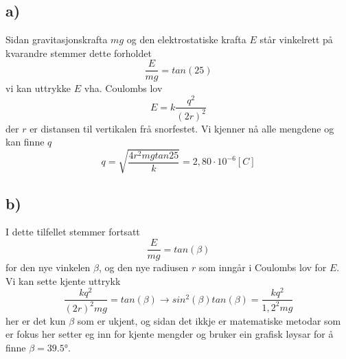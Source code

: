 \documentclass[12pt,a4paper]{article}
\begin{document}
    \subsection*{a)}
    Sidan gravitasjonskrafta $mg$ og den elektrostatiske krafta $E$ står vinkelrett
    på kvarandre stemmer dette forholdet
    \begin{equation}
      \frac{E}{mg} = tan(25)
    \end{equation}
    vi kan uttrykke $E$ vha. Coulombs lov
    \begin{equation}
      E = k\frac{q^2}{(2r)^2}
    \end{equation}
    der $r$ er distansen til vertikalen frå snorfestet. Vi kjenner nå alle mengdene og kan
    finne $q$
    \begin{equation}
      q = \sqrt{\frac{4r^2mgtan25}{k}} = 2,80\cdot10^{-6} [C]
    \end{equation}

    \subsection*{b)}
    I dette tilfellet stemmer fortsatt
    \begin{equation}
      \frac{E}{mg} = tan(\beta)
    \end{equation}
    for den nye vinkelen $\beta$, og den nye radiusen $r$ som inngår i Coulombs lov for $E$.
    Vi kan sette kjente uttrykk 
    \begin{equation}
      \frac{kq^2}{(2r)^2 mg} = tan(\beta) \longrightarrow 
      sin^2(\beta)tan(\beta) = \frac{kq^2}{1,2^2mg}
    \end{equation}
    her er det kun $\beta$ som er ukjent, og sidan det ikkje er matematiske
    metodar som er fokus her setter eg inn for kjente mengder og bruker ein
    grafisk løysar for å finne $\beta = \ang{39,5}$.
\end{document}

